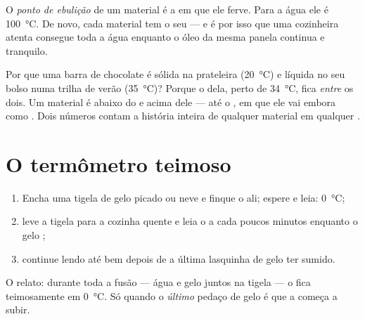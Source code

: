 \begin{definition}\label{def:g4:changes-of-state:boiling-point}
O \emph{ponto de ebulição} de um material é
a  em que ele ferve. Para a água ele é
\qty{100}{\celsius}. De novo, cada material tem o seu --- e é por
isso que uma cozinheira atenta consegue  toda a água enquanto
o óleo da mesma panela continua  e tranquilo.
\end{definition}

\begin{example}\label{ex:g4:changes-of-state:reading}
Por que uma barra de chocolate é sólida na prateleira
(\qty{20}{\celsius}) e líquida no seu bolso numa trilha de verão
(\qty{35}{\celsius})? Porque o  dela, perto de
\qty{34}{\celsius}, fica \emph{entre} os dois. Um material é 
abaixo do  e  acima dele --- até o , em que ele vai embora como . Dois números contam a
história inteira de qualquer material em qualquer .
\end{example}

\section{O termômetro teimoso}

\begin{method}\label{met:g4:changes-of-state:watch}
\begin{enumerate}
  \item Encha uma tigela de gelo picado ou neve e finque o 
        ali; espere e leia: \qty{0}{\celsius};
  \item leve a tigela para a cozinha quente e leia o  a
        cada poucos minutos enquanto o gelo ;
  \item continue lendo até bem depois de a última lasquinha de gelo
        ter sumido.
\end{enumerate}
O relato: durante toda a fusão --- água e gelo juntos na tigela --- o
 fica teimosamente em \qty{0}{\celsius}. Só quando o
\emph{último} pedaço de gelo  é que a  começa a
subir.
\end{method}

